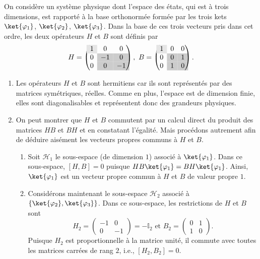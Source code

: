 \begin{example}
On considère un système physique dont l'espace des états, qui est à trois
dimensions, est rapporté à la base orthonormée formée par les trois kets
$\ket{\varphi_1} $, $\ket{\varphi_{2}}$, $\ket{\varphi_3} $. Dans la base de
ces trois vecteurs pris dans cet ordre, les deux opérateurs $H$ et $B$ sont
définis par
\begin{equation}
H=\begin{pmatrix}
\cellcolor[gray]{.9} 1 & 0 & 0\\
0 & \cellcolor[gray]{.8} -1 & \cellcolor[gray]{.8} 0\\
0 & \cellcolor[gray]{.8} 0 & \cellcolor[gray]{.8} -1
\end{pmatrix} ,\text{ }B=\begin{pmatrix}
\cellcolor[gray]{.9} 1 & 0 & 0\\
0 & \cellcolor[gray]{.8} 0 & \cellcolor[gray]{.8} 1\\
0 & \cellcolor[gray]{.8} 1 & \cellcolor[gray]{.8} 0
\end{pmatrix} .
\end{equation}


\begin{enumerate}
\item Les opérateurs $H$ et $B$ sont hermitiens car ils sont représentés par des
matrices symétriques, réelles. Comme en plus, l'espace est de dimension finie,
elles sont diagonalisables et représentent donc des grandeurs physiques.

\item On peut montrer que $H$ et $B$ commutent par un calcul direct du produit
des matrices $HB$ et $BH$ et en constatant l'égalité. Mais procédons autrement
afin de déduire aisément les vecteurs propres communs à $H$ et $B$.

\begin{enumerate}
\item Soit $\mathcal{H}_1$ le sous-espace (de dimension $1$) associé à
$\ket{\varphi_1}$. Dans ce sous-espace, $[H,B]=0$ puisque
$HB\ket{\varphi_1}=BH\ket{\varphi_1}$. Ainsi, $\ket{\varphi_1} $ est un
vecteur propre commun à $H$ et $B$ de valeur propre $1$.

\item Considérons maintenant le sous-espace $\mathcal{H}_{2}$ associé à
$\{\ket{\varphi_{2}},\ket{\varphi_3}\}$. Dans ce sous-espace, les restrictions
de $H$ et $B$ sont%
\begin{equation}
H_{2}=\begin{pmatrix}
-1 & 0\\
0 & -1
\end{pmatrix} =-\mathbb{I}_{2}\text{ et }B_{2}=\begin{pmatrix}
0 & 1\\
1 & 0
\end{pmatrix} .
\end{equation}
Puisque $H_{2}$ est proportionnelle à la matrice unité, il commute avec toutes
les matrices carrées de rang $2$, i.e., $[H_{2},B_{2}]=0$.


\end{enumerate}
\end{enumerate}
\end{example}
